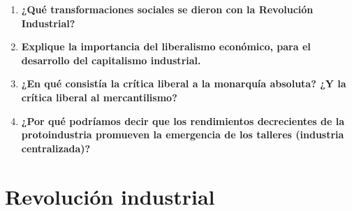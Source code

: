 \documentclass[12pt]{book}
\begin{document}
\begin{enumerate}
\item \textbf{¿Qué transformaciones sociales se dieron con la Revolución Industrial?}
\item \textbf{Explique la importancia del liberalismo económico, para el desarrollo del
capitalismo industrial.}
\item \textbf{¿En qué consistía la crítica liberal a la monarquía absoluta? ¿Y la crítica liberal al
mercantilismo?}


\item \textbf{¿Por qué podríamos decir que los rendimientos decrecientes de la protoindustria
promueven la emergencia de los talleres (industria centralizada)?}

\end{enumerate}

\chapter{Revoluci\'on industrial}
\end{document}
